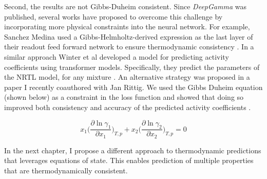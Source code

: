 Second, the results are not Gibbs-Duheim  consistent. Since \textit{DeepGamma} was published, several works have proposed to overcome this challenge by incorporating more physical constraints into the neural network. For example, Sanchez Medina used  a Gibbs-Helmholtz-derived expression as the last layer of their readout feed forward network to ensure thermodynamic consistency \cite{SanchezMedina2023}. In a similar approach Winter et al developed a model for predicting activity coefficients using transformer models. Specifically, they predict the parameters of the NRTL model, for any mixture \cite{Winter2022}. An alternative strategy was proposed in a paper I recently coauthored with Jan Rittig. We used the Gibbs Duheim equation (shown below) as a constraint in the loss function and showed that doing so improved both consistency and accuracy of the predicted activity coefficients \cite{Rittig2023b}.

\begin{equation}
    x_1 \biggl (\frac{\partial \ln \gamma_1}{\partial x_1}\biggr)_{T,p} + x_2 \biggl (\frac{\partial \ln \gamma_2}{\partial x_2}\biggr)_{T,p} = 0
\end{equation}

In the next chapter, I propose a different approach to thermodynamic predictions that leverages equations of state. This enables prediction of multiple properties that are thermodynamically consistent.

